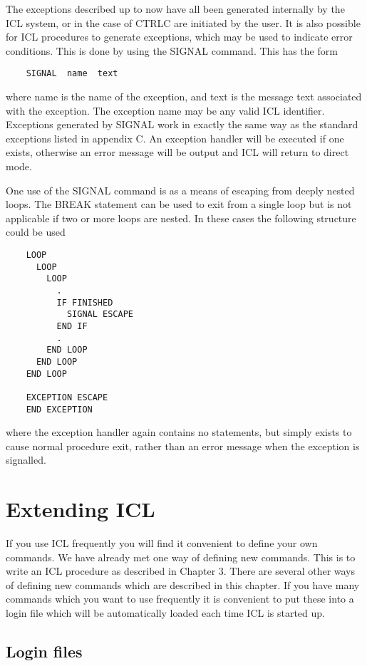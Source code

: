 The exceptions described up to now have all been generated internally by the 
ICL system, or in the case of CTRLC are initiated by the user. It is also
possible for ICL procedures to generate exceptions, which may be used to
indicate error conditions. This is done by using the SIGNAL command. This
has the form
\begin{verbatim}
    SIGNAL  name  text
\end{verbatim}
where name is the name of the exception, and text is the message text 
associated with the exception. The exception name may be any valid ICL
identifier. Exceptions generated by SIGNAL work in exactly the same way
as the standard exceptions listed in appendix C. An exception handler
will be executed if one exists, otherwise an error message will be output
and ICL will return to direct mode.

One use of the SIGNAL command is as a means of escaping from deeply nested
loops. The BREAK statement can be used to exit from a single loop but is
not applicable if two or more loops are nested. In these cases the following
structure could be used
\begin{verbatim}
    LOOP
      LOOP
        LOOP
          .
          IF FINISHED
            SIGNAL ESCAPE
          END IF
          .
        END LOOP
      END LOOP
    END LOOP

    EXCEPTION ESCAPE
    END EXCEPTION
\end{verbatim}

where the exception handler again contains no statements, but simply exists
to cause normal procedure exit, rather than an error message when the 
exception is signalled.

\chapter{Extending ICL}

If you use ICL frequently you will find it convenient to define your own
commands. We have already met one way of defining new commands. This is
to write an ICL procedure as described in Chapter 3. There are several other
ways of defining new commands which are described in this chapter. If you
have many commands which you want to use frequently it is convenient to
put these into a login file which will be automatically loaded each time
ICL is started up.

\section{Login files}

